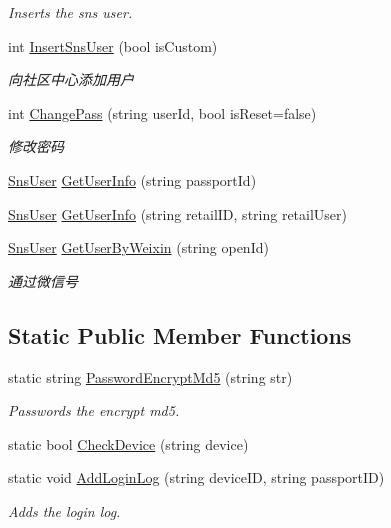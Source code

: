\begin{DoxyCompactItemize}
\begin{DoxyCompactList}\small\item\em Inserts the sns user. \end{DoxyCompactList}\item 
int \mbox{\hyperlink{class_t_net_1_1_sns_1_1_sns_center_user_a4aa37fd81f9d4b3401995d2329a6d4ed}{Insert\+Sns\+User}} (bool is\+Custom)
\begin{DoxyCompactList}\small\item\em 向社区中心添加用户 \end{DoxyCompactList}\item 
int \mbox{\hyperlink{class_t_net_1_1_sns_1_1_sns_center_user_a84d2ca90d4068a0f506758de490de577}{Change\+Pass}} (string user\+Id, bool is\+Reset=false)
\begin{DoxyCompactList}\small\item\em 修改密码 \end{DoxyCompactList}\item 
\mbox{\hyperlink{class_t_net_1_1_sns_1_1_sns_user}{Sns\+User}} \mbox{\hyperlink{class_t_net_1_1_sns_1_1_sns_center_user_ab96e678bd2b50fd3c5f395c119d4ca50}{Get\+User\+Info}} (string passport\+Id)
\item 
\mbox{\hyperlink{class_t_net_1_1_sns_1_1_sns_user}{Sns\+User}} \mbox{\hyperlink{class_t_net_1_1_sns_1_1_sns_center_user_af46e361389c79d0524b6c0954cf25253}{Get\+User\+Info}} (string retail\+ID, string retail\+User)
\item 
\mbox{\hyperlink{class_t_net_1_1_sns_1_1_sns_user}{Sns\+User}} \mbox{\hyperlink{class_t_net_1_1_sns_1_1_sns_center_user_a587b74d0e06690b4275b30ccaef2dddb}{Get\+User\+By\+Weixin}} (string open\+Id)
\begin{DoxyCompactList}\small\item\em 通过微信号 \end{DoxyCompactList}\end{DoxyCompactItemize}
\subsection*{Static Public Member Functions}
\begin{DoxyCompactItemize}
\item 
static string \mbox{\hyperlink{class_t_net_1_1_sns_1_1_sns_center_user_a9406de7c4124b5dfb3061fdac1f60985}{Password\+Encrypt\+Md5}} (string str)
\begin{DoxyCompactList}\small\item\em Passwords the encrypt md5. \end{DoxyCompactList}\item 
static bool \mbox{\hyperlink{class_t_net_1_1_sns_1_1_sns_center_user_a96b414c603449fb5c66f730429d26cf0}{Check\+Device}} (string device)
\item 
static void \mbox{\hyperlink{class_t_net_1_1_sns_1_1_sns_center_user_aa5dc23bca56d74c24aeafd509bafb12e}{Add\+Login\+Log}} (string device\+ID, string passport\+ID)
\begin{DoxyCompactList}\small\item\em Adds the login log. \end{DoxyCompactList}\end{DoxyCompactItemize}

